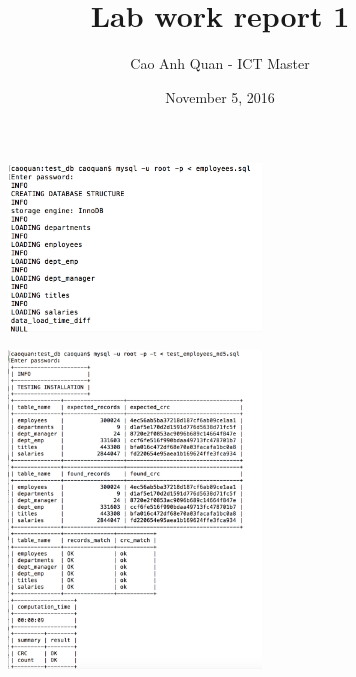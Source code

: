 \documentclass[12pt, letterpaper, twoside]{article}
\title{Lab work report 1}
\author{Cao Anh Quan - ICT Master}
\date{November 5, 2016}
\begin{document}
 
\begin{titlepage}
\maketitle
\end{titlepage}


\begin{figure}[h]
\centerline{\includegraphics[width=0.6\textwidth]{img2.jpg}}
\end{figure}



\begin{figure}[h]
\centerline{\includegraphics[width=0.6\textwidth]{img1.jpg}}
\end{figure}

 
\end{document}
